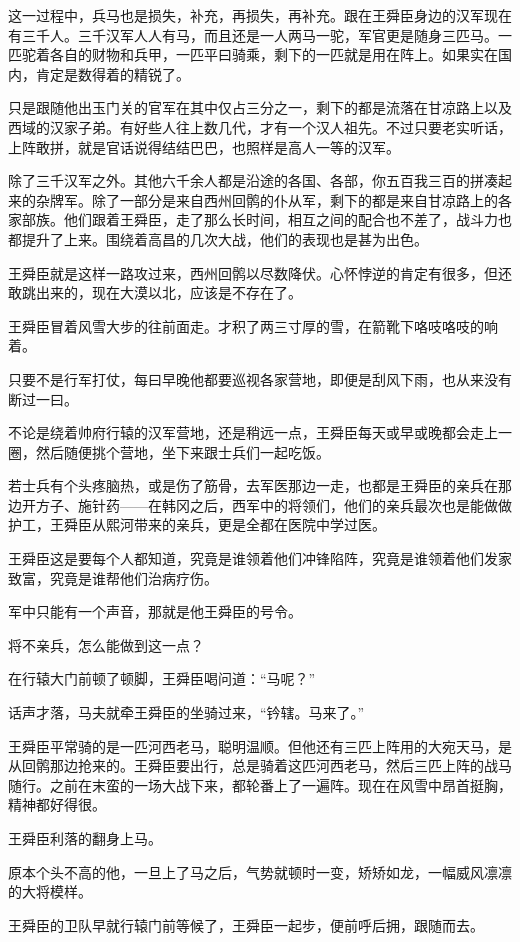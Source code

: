 这一过程中，兵马也是损失，补充，再损失，再补充。跟在王舜臣身边的汉军现在有三千人。三千汉军人人有马，而且还是一人两马一驼，军官更是随身三匹马。一匹驼着各自的财物和兵甲，一匹平曰骑乘，剩下的一匹就是用在阵上。如果实在国内，肯定是数得着的精锐了。

只是跟随他出玉门关的官军在其中仅占三分之一，剩下的都是流落在甘凉路上以及西域的汉家子弟。有好些人往上数几代，才有一个汉人祖先。不过只要老实听话，上阵敢拼，就是官话说得结结巴巴，也照样是高人一等的汉军。

除了三千汉军之外。其他六千余人都是沿途的各国、各部，你五百我三百的拼凑起来的杂牌军。除了一部分是来自西州回鹘的仆从军，剩下的都是来自甘凉路上的各家部族。他们跟着王舜臣，走了那么长时间，相互之间的配合也不差了，战斗力也都提升了上来。围绕着高昌的几次大战，他们的表现也是甚为出色。

王舜臣就是这样一路攻过来，西州回鹘以尽数降伏。心怀悖逆的肯定有很多，但还敢跳出来的，现在大漠以北，应该是不存在了。

王舜臣冒着风雪大步的往前面走。才积了两三寸厚的雪，在箭靴下咯吱咯吱的响着。

只要不是行军打仗，每曰早晚他都要巡视各家营地，即便是刮风下雨，也从来没有断过一曰。

不论是绕着帅府行辕的汉军营地，还是稍远一点，王舜臣每天或早或晚都会走上一圈，然后随便挑个营地，坐下来跟士兵们一起吃饭。

若士兵有个头疼脑热，或是伤了筋骨，去军医那边一走，也都是王舜臣的亲兵在那边开方子、施针药——在韩冈之后，西军中的将领们，他们的亲兵最次也是能做做护工，王舜臣从熙河带来的亲兵，更是全都在医院中学过医。

王舜臣这是要每个人都知道，究竟是谁领着他们冲锋陷阵，究竟是谁领着他们发家致富，究竟是谁帮他们治病疗伤。

军中只能有一个声音，那就是他王舜臣的号令。

将不亲兵，怎么能做到这一点？

在行辕大门前顿了顿脚，王舜臣喝问道：“马呢？”

话声才落，马夫就牵王舜臣的坐骑过来，“钤辖。马来了。”

王舜臣平常骑的是一匹河西老马，聪明温顺。但他还有三匹上阵用的大宛天马，是从回鹘那边抢来的。王舜臣要出行，总是骑着这匹河西老马，然后三匹上阵的战马随行。之前在末蛮的一场大战下来，都轮番上了一遍阵。现在在风雪中昂首挺胸，精神都好得很。

王舜臣利落的翻身上马。

原本个头不高的他，一旦上了马之后，气势就顿时一变，矫矫如龙，一幅威风凛凛的大将模样。

王舜臣的卫队早就行辕门前等候了，王舜臣一起步，便前呼后拥，跟随而去。

